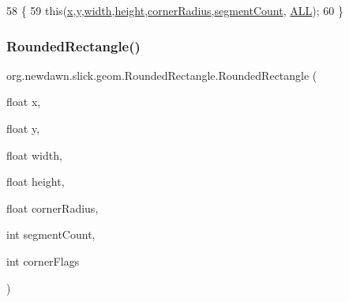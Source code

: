 \begin{DoxyCode}
58                                                                                                            
          \{
59         \textcolor{keyword}{this}(\mbox{\hyperlink{classorg_1_1newdawn_1_1slick_1_1geom_1_1_shape_a3e985bfff386c15a4efaad03d8ad60d3}{x}},\mbox{\hyperlink{classorg_1_1newdawn_1_1slick_1_1geom_1_1_shape_a9f934baded6a1b65ebb69e7e5f80ea00}{y}},\mbox{\hyperlink{classorg_1_1newdawn_1_1slick_1_1geom_1_1_rectangle_a967e1823f62daf45abb142779d1be62d}{width}},\mbox{\hyperlink{classorg_1_1newdawn_1_1slick_1_1geom_1_1_rectangle_a3bd010fdce636fc11ed0e0ad4d4b4a0a}{height}},\mbox{\hyperlink{classorg_1_1newdawn_1_1slick_1_1geom_1_1_rounded_rectangle_a3326619644f3ba7e5493f8b191011aa1}{cornerRadius}},\mbox{\hyperlink{classorg_1_1newdawn_1_1slick_1_1geom_1_1_rounded_rectangle_a581d9cd03fceac25161fe5ce6e574e19}{segmentCount}},
      \mbox{\hyperlink{classorg_1_1newdawn_1_1slick_1_1geom_1_1_rounded_rectangle_a5f7a27b3a8d4b4b9c2ea8776674a0fd8}{ALL}});
60     \}
\end{DoxyCode}
\mbox{\label{classorg_1_1newdawn_1_1slick_1_1geom_1_1_rounded_rectangle_a0256971275408059387e850994e86c79}} 
\subsubsection{\texorpdfstring{Rounded\+Rectangle()}{RoundedRectangle()}\hspace{0.1cm}{\footnotesize\ttfamily [3/3]}}
{\footnotesize\ttfamily org.\+newdawn.\+slick.\+geom.\+Rounded\+Rectangle.\+Rounded\+Rectangle (\begin{DoxyParamCaption}\item[{float}]{x,  }\item[{float}]{y,  }\item[{float}]{width,  }\item[{float}]{height,  }\item[{float}]{corner\+Radius,  }\item[{int}]{segment\+Count,  }\item[{int}]{corner\+Flags }\end{DoxyParamCaption})\hspace{0.3cm}{\ttfamily [inline]}}


